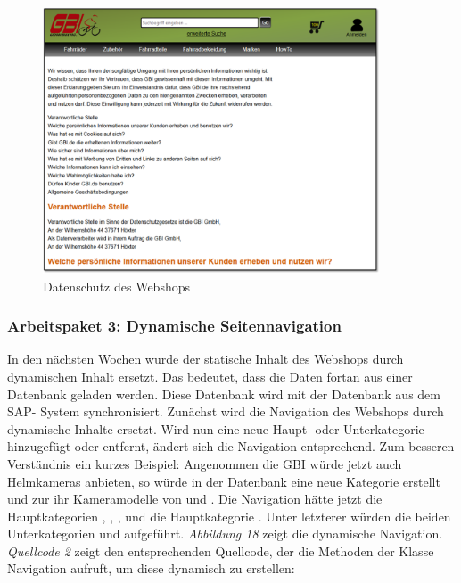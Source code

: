 \begin{figure}
\begin{center}
\includegraphics[width=10cm]{Bilder/Abbildung8-DatenschutzDesWebshops.png}
\end{center}
\caption{Datenschutz des Webshops}
\end{figure}

\newpage
\subsubsection{Arbeitspaket 3: Dynamische Seitennavigation}

In den nächsten Wochen wurde der statische Inhalt des Webshops durch dynamischen Inhalt ersetzt. Das bedeutet, dass die Daten fortan aus einer Datenbank geladen werden. Diese Datenbank wird mit der Datenbank aus dem SAP- System synchronisiert. Zunächst wird die Navigation des Webshops durch dynamische Inhalte ersetzt. Wird nun eine neue Haupt- oder Unterkategorie hinzugefügt oder entfernt, ändert sich die Navigation entsprechend. Zum besseren Verständnis ein kurzes Beispiel: Angenommen die GBI würde jetzt auch Helmkameras anbieten, so würde in der Datenbank eine neue Kategorie \grqq{} erstellt und zur ihr Kameramodelle von \grqq{} und \grqq{}. Die Navigation hätte jetzt die Hauptkategorien \grqq{}, \grqq{}, \grqq{}, \grqq{} und die Hauptkategorie \grqq{}. Unter letzterer würden die beiden Unterkategorien \grqq{} und \grqq{} aufgeführt. \textit{Abbildung 18} zeigt die dynamische Navigation.
\textit{Quellcode 2} zeigt den entsprechenden Quellcode, der die Methoden der Klasse Navigation aufruft, um diese dynamisch zu erstellen:

